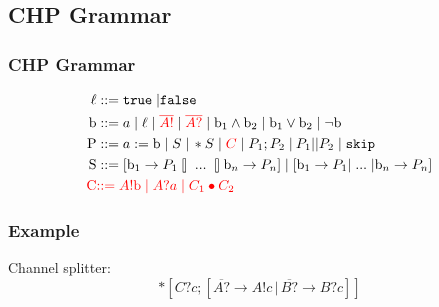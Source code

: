 \documentclass[compress]{beamer}
\begin{document}
\subsection{CHP Grammar}
\begin{frame}
    \frametitle{CHP Grammar}
    \begin{align*}
        \ell & ::= \mathtt{true} \; | \mathtt{false} \\
        \mathrm{b} & ::= a \; | \; \ell \; | \; {\color{red} \overline{A!}} \; | \; {\color{red} \overline{A?}} \; | \; \mathrm{b}_1 \wedge \mathrm{b}_2 \; | \; \mathrm{b}_1 \vee \mathrm{b}_2 \; | \; \lnot \mathrm{b} \\
        \mathrm{P} & ::= a := \mathrm{b} \; | \; S \; | \, *S \; | \; {\color{red} C} \; | \; P_1; P_2 \; | \: P_1 || P_2 \; | \; \mathtt{skip} \\
        \mathrm{S} & ::= [ \mathrm{b}_1 \rightarrow P_1 \talloblong \; ... \; \talloblong \mathrm{b}_n \rightarrow P_n ] \; | \; [ \mathrm{b}_1 \rightarrow P_1 | \; ... \; | \mathrm{b}_n \rightarrow P_n ] \\
        {\color{red} \mathrm{C}} & {\color{red} ::= A!\mathrm{b} \; | \; A?a \; | \; C_1 \bullet C_2}
    \end{align*}
\end{frame}

\begin{frame}
    \frametitle{Example}
    Channel splitter:
    {\small $$*[C?c; [\overline{A?} \rightarrow A!c \, | \, \overline{B?} \rightarrow B?c]]$$}
\end{frame}
\end{document}
